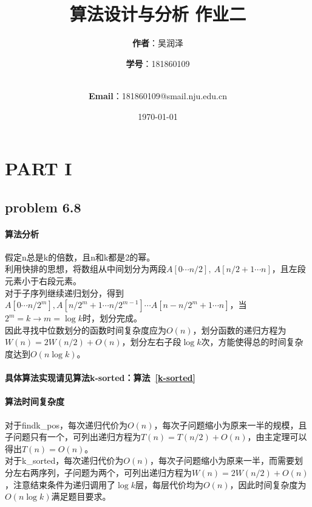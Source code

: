 \documentclass[11pt]{ctexart}
\title{\Huge\textbf{算法设计与分析 作业二}\\}
\author{\Large\textbf{作者}：吴润泽 \and{\Large\textbf{学号}：181860109}\\
	\\
	\and {\Large\textbf{Email}：181860109@smail.nju.edu.cn}\\}
\date{\Large\today}
\begin{document}
	\maketitle

	\tableofcontents
		\newpage
	\section*{PART I}
	\subsection*{problem 6.8}
		
	\paragraph{算法分析}假定n总是k的倍数，且n和k都是2的幂。\\
	\hspace*{20pt}利用快排的思想，将数组从中间划分为两段$A[0\cdots n/2],\ A[n/2+1\cdots n]$，且左段元素小于右段元素。\\
	\hspace*{20pt}对于子序列继续递归划分，得到$A[0\cdots n/2^m],A[n/2^m+1\cdots n/2^{m-1}]\cdots A[n-n/2^m+1\cdots n]$，当$2^m=k\rightarrow m=\log k$时，划分完成。\\
	\hspace*{20pt}因此寻找中位数划分的函数时间复杂度应为$O(n)$，划分函数的递归方程为$W(n)=2W(n/2)+O(n)$，划分左右子段$\log k$次，方能使得总的时间复杂度达到$O(n\log k)$。
	\paragraph{具体算法实现请见算法k-sorted：算法~\ref{k-sorted}}
	\paragraph{算法时间复杂度}
	对于findk\_pos，每次递归代价为$O(n)$，每次子问题缩小为原来一半的规模，且子问题只有一个，可列出递归方程为$T(n)=T(n/2)+O(n)$，由主定理可以得出$T(n)=O(n)$。\\
	\hspace*{20pt}对于k\_sorted，每次递归代价为$O(n)$，每次子问题缩小为原来一半，而需要划分左右两序列，子问题为两个，可列出递归方程为$W(n)=2W(n/2)+O(n)$，注意结束条件为递归调用了$\log k$层，每层代价均为$O(n)$，因此时间复杂度为$O(n\log k)$满足题目要求。
	
\end{document}
